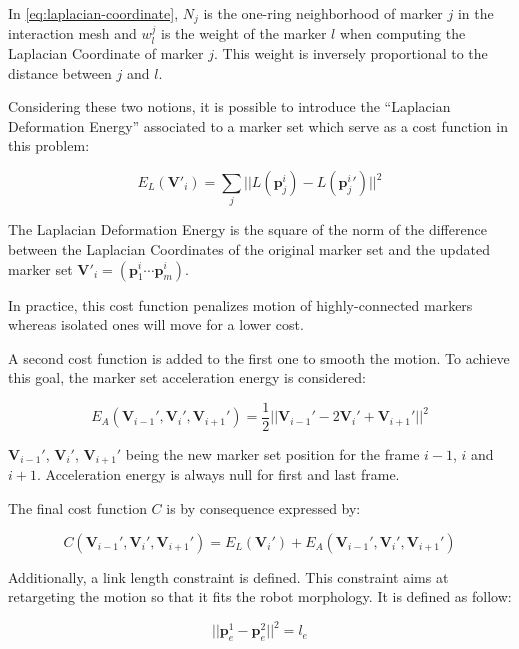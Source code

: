 \documentclass[letterpaper, 10 pt, conference]{ieeeconf}  %
\begin{document}
In \autoref{eq:laplacian-coordinate}, $N_j$ is the one-ring
neighborhood of marker $j$ in the interaction mesh and $w^j_l$ is the
weight of the marker $l$ when computing the Laplacian Coordinate of
marker $j$. This weight is inversely proportional to the distance
between $j$ and $l$.

Considering these two notions, it is possible to introduce the
``Laplacian Deformation Energy'' associated to a marker set which
serve as a cost function in this problem:

\begin{equation}
E_L(\mathbf{V'}_i) = \sum_j || L(\mathbf{p}^i_j) - L(\mathbf{p}^i_j{}') ||^2
\end{equation}

The Laplacian Deformation Energy is the square of the norm of the
difference between the Laplacian Coordinates of the original marker
set and the updated marker set $\mathbf{V}'_i = (\mathbf{p}^i_1 \cdots
\mathbf{p}^i_m)$.

In practice, this cost function penalizes motion of highly-connected
markers whereas isolated ones will move for a lower cost.


A second cost function is added to the first one to smooth the
motion. To achieve this goal, the marker set acceleration energy is
considered:

\begin{equation}
  E_A(\mathbf{V}_{i-1}', \mathbf{V}_{i}', \mathbf{V}_{i+1}') =
  \frac{1}{2} || \mathbf{V}_{i-1}' - 2 \mathbf{V}_{i}' + \mathbf{V}_{i+1}' ||^2
\end{equation}

$\mathbf{V}_{i-1}'$, $\mathbf{V}_{i}'$, $\mathbf{V}_{i+1}'$ being the
new marker set position for the frame $i - 1$, $i$ and $i +
1$. Acceleration energy is always null for first and last frame.

The final cost function $C$ is by consequence expressed by:

\begin{equation}
    C(\mathbf{V}_{i-1}', \mathbf{V}_{i}', \mathbf{V}_{i+1}') =
    E_L(\mathbf{V}_{i}') + E_A(\mathbf{V}_{i-1}', \mathbf{V}_{i}', \mathbf{V}_{i+1}')
\end{equation}


Additionally, a link length constraint is defined. This constraint
aims at retargeting the motion so that it fits the robot
morphology. It is defined as follow:

\begin{equation}
|| \mathbf{p}^1_e - \mathbf{p}^2_e ||^2 = l_e
\end{equation}
\end{document}
